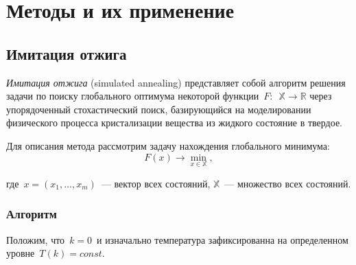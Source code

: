 

\chapter{Методы и их применение} \label{chap2}

\section{Имитация отжига}

\noindent
\textit{Имитация отжига} (simulated annealing) представляет собой алгоритм решения задачи по поиску глобального оптимума некоторой функции~$F:$~$\mathbb{X} \to \mathbb{R}$ через упорядоченный стохастический поиск, базирующийся на моделировании физического процесса кристализации вещества из жидкого состояние в твердое.

Для описания метода рассмотрим задачу нахождения глобального минимума:
\[
	F(x) \to \min \limits _{x \in \mathbb{X}},
\]

\noindent где~$x = (x_{1},\ldots , x_{m})$~--- вектор всех состояний, $\mathbb{X}$~--- множество всех состояний.

\subsection{Алгоритм}

\noindent Положим, что~$k = 0$~и изначально температура зафиксированна на определенном уровне~$T(k) = const$.


